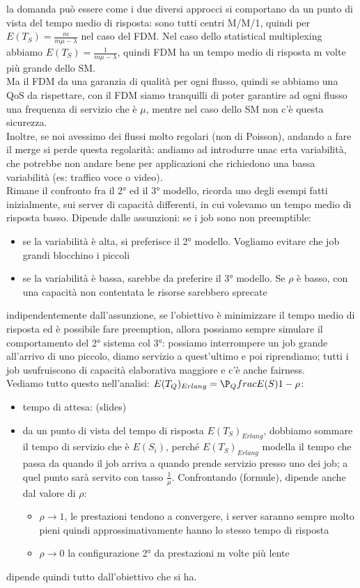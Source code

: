 \documentclass{article}
\begin{document}
la domanda può essere come i due diversi approcci si comportano da un punto di vista del tempo medio di risposta: sono tutti centri M/M/1, quindi per $E(T_S) = \frac{m}{m \mu - \lambda}$ nel caso del FDM. Nel caso dello statistical multiplexing abbiamo $E(T_S) = \frac{1}{m \mu - \lambda}$, quindi FDM ha un tempo medio di risposta m volte più grande dello SM.\\ Ma il FDM da una garanzia di qualità per ogni flusso, quindi se abbiamo una QoS da rispettare, con il FDM siamo tranquilli di poter garantire ad ogni flusso una frequenza di servizio che è $\mu$, mentre nel caso dello SM non c'è questa sicurezza.\\ Inoltre, se noi avessimo dei flussi molto regolari (non di Poisson), andando a fare il merge si perde questa regolarità: andiamo ad introdurre unac erta variabilità, che potrebbe non andare bene per applicazioni che richiedono una bassa variabilità (es: traffico voce o video).\\ Rimane il confronto fra il 2° ed il 3° modello, ricorda uno degli esempi fatti inizialmente, sui server di capacità differenti, in cui volevamo un tempo medio di risposta basso. Dipende dalle assunzioni: se i job sono non preemptible:
\begin{itemize}
\item se la variabilità è alta, si preferisce il 2° modello. Vogliamo evitare che job grandi blocchino i piccoli
\item se la variabilità è bassa, sarebbe da preferire il 3° modello. Se $\rho$ è basso, con una capacità non contentata le risorse sarebbero sprecate
\end{itemize}
indipendentemente dall'assunzione, se l'obiettivo è minimizzare il tempo medio di risposta ed è possibile fare preemption, allora possiamo sempre simulare il comportamento del 2° sistema col 3°: possiamo interrompere un job grande all'arrivo di uno piccolo, diamo servizio a quest'ultimo e poi riprendiamo; tutti i job usufruiscono di capacità elaborativa maggiore e c'è anche fairness.\\ Vediamo tutto questo nell'analisi: $E(T_Q)_{Erlang} = \P_Qfrac{E(S)}{1 - \rho}$:
\begin{itemize}
\item tempo di attesa: (slides)
\item da un punto di vista del tempo di risposta $E(T_S)_{Erlang}$, dobbiamo sommare il tempo di servizio che è $E(S_i)$, perché $E(T_S)_{Erlang}$ modella il tempo che passa da quando il job arriva a quando prende servizio presso uno dei job; a quel punto sarà servito con tasso $\frac{1}{\mu}$. Confrontando (formule), dipende anche dal valore di $\rho$:
\begin{itemize}
\item $\rho \longrightarrow 1$, le prestazioni tendono a convergere, i server saranno sempre molto pieni quindi approssimativamente hanno lo stesso tempo di risposta
\item $\rho \longrightarrow 0$ la configurazione 2° da prestazioni m volte più lente
\end{itemize}
\end{itemize}
dipende quindi tutto dall'obiettivo che si ha.\\ 
\end{document}
